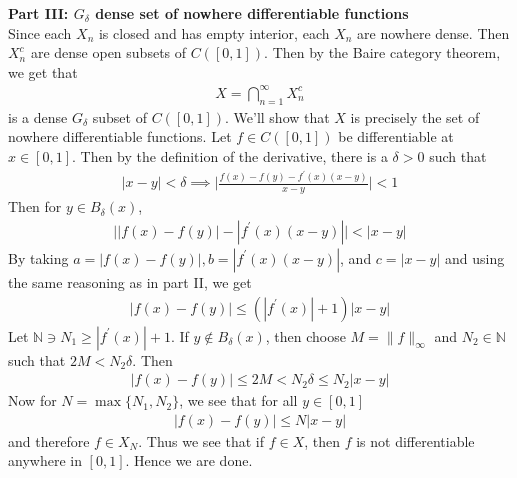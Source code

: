 \documentclass[12pt]{exam}
\theoremstyle{plain} %
\theoremstyle{definition} %
\theoremstyle{remark} %
\begin{document}
\begin{questions}
\begin{solution}
    \textbf{Part III: $G_\delta$ dense set of nowhere differentiable
    functions}\\
    Since each $X_n$ is closed and has empty interior, each $X_n$ are
    nowhere dense. Then $X_n^c$ are dense open subsets of $C([0, 1])$.
    Then by the Baire category theorem, we get that
    \begin{align*}
      X = \bigcap_{n = 1}^{\infty} X_n^c
    \end{align*}
    is a dense $G_\delta$ subset of $C([0, 1])$. We'll show that $X$
    is precisely the set of nowhere differentiable functions. Let $f
    \in C([0, 1])$ be differentiable at $x \in [0, 1]$. Then by the
    definition of the derivative, there is
    a $\delta > 0$ such that
    \begin{align*}
      |x - y|< \delta \implies \bigg|
      \frac{f(x)-f(y)-f^\prime(x)(x-y)}{x-y}\bigg|< 1
    \end{align*}
    Then for $y \in B_\delta(x)$,
    \begin{align*}
      \Big||f(x) - f(y)| - |f^\prime(x)(x- y)|\Big| < |x-y|
    \end{align*}
    By taking $a = |f(x) - f(y)|, b =
    |f^\prime(x)(x-y)|$, and $c = |x - y|$ and using the same
    reasoning as in part II, we get
    \begin{align*}
      |f(x) - f(y)| \le (|f^\prime(x)| + 1)|x - y|
    \end{align*}
    Let $\mathbb{N} \ni N_1 \ge |f^\prime(x)| + 1$.
    If $y \not\in B_\delta(x)$, then choose $M = \|f\|_\infty$ and
    $N_2 \in \mathbb{N}$ such that $2M < N_2 \delta$. Then
    \begin{align*}
      |f(x) - f(y)| \le 2 M < N_2 \delta \le N_2 |x - y|
    \end{align*}
    Now for $N = \max \{ N_1, N_2 \}$, we see that for all $y \in [0, 1]$
    \begin{align*}
      |f(x) - f(y)| \le N |x - y|
    \end{align*}
    and therefore $f \in X_N$. Thus we see that if $f \in X$, then
    $f$ is not differentiable anywhere in $[0, 1]$. Hence we are done.
  \end{solution}

\end{questions}
\printbibliography[heading=bibintoc]
\end{document}
